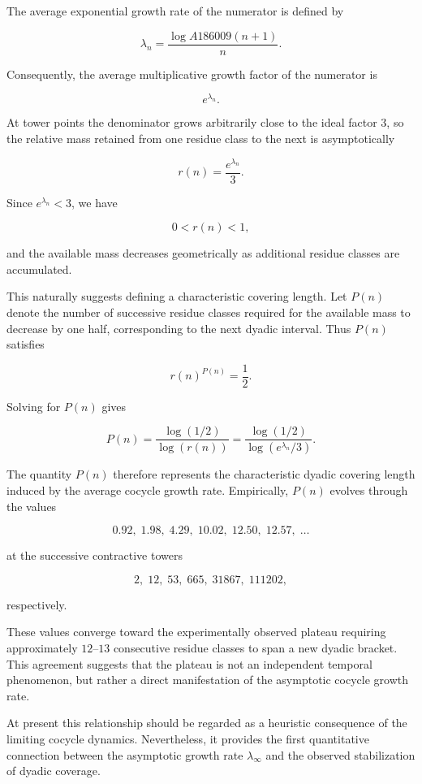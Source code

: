 \documentclass[12pt, oneside]{article}
\numberwithin{equation}{section}
\theoremstyle{definition}
\theoremstyle{plain}
\theoremstyle{remark}
\begin{document}
The average exponential growth rate of the numerator is defined by

\[
\lambda_n
=
\frac{\log A186009(n+1)}{n}.
\]

Consequently, the average multiplicative growth factor of the numerator is

\[
e^{\lambda_n}.
\]

At tower points the denominator grows arbitrarily close to the ideal factor $3$,
so the relative mass retained from one residue class to the next is asymptotically

\[
r(n)
=
\frac{e^{\lambda_n}}{3}.
\]

Since $e^{\lambda_n}<3$, we have

\[
0<r(n)<1,
\]

and the available mass decreases geometrically as additional residue classes are accumulated.

This naturally suggests defining a characteristic covering length. Let $P(n)$ denote
the number of successive residue classes required for the available mass to decrease
by one half, corresponding to the next dyadic interval. Thus $P(n)$ satisfies

\[
r(n)^{P(n)}
=
\frac12.
\]

Solving for $P(n)$ gives

\[
P(n)
=
\frac{\log(1/2)}
{\log(r(n))}
=
\frac{\log(1/2)}
{\log\!\left(e^{\lambda_n}/3\right)}.
\]

The quantity $P(n)$ therefore represents the characteristic dyadic covering length
induced by the average cocycle growth rate.  Empirically, $P(n)$ evolves through the values

\[
0.92,\;
1.98,\;
4.29,\;
10.02,\;
12.50,\;
12.57,\;
\ldots
\]

at the successive contractive towers

\[
2,\;
12,\;
53,\;
665,\;
31867,\;
111202,
\]

respectively.

These values converge toward the experimentally observed plateau requiring
approximately $12$--$13$ consecutive residue classes to span a new dyadic
bracket. This agreement suggests that the plateau is not an independent temporal
phenomenon, but rather a direct manifestation of the asymptotic cocycle growth rate.

At present this relationship should be regarded as a heuristic consequence of
the limiting cocycle dynamics. Nevertheless, it provides the first quantitative
connection between the asymptotic growth rate $\lambda_\infty$ and the observed
stabilization of dyadic coverage.
\end{document}
